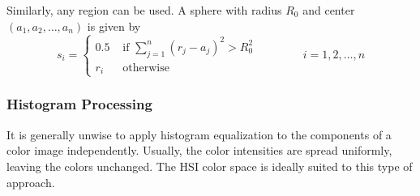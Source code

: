 Similarly, any region can be used. A sphere with radius $R_0$ and center $(a_1,a_2,\dots,a_n)$ is given by
\begin{equation}
	s_i = \begin{cases}
		0.5 & \text{  if } \sum_{j=1}^{n} (r_j - a_j)^2 > R_0^2 \\
		r_i & \text{  otherwise}
	\end{cases} \qquad \qquad i = 1,2,\dots,n
\end{equation}

%
%

\subsubsection{Histogram Processing }
It is generally unwise to apply histogram equalization to the components of a color image independently. Usually, the color intensities are spread uniformly, leaving the colors unchanged. The HSI color space is ideally suited to this type of approach.

